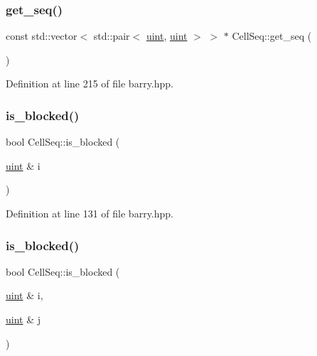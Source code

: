 \subsubsection{\texorpdfstring{get\+\_\+seq()}{get\_seq()}}
{\footnotesize\ttfamily const std\+::vector$<$ std\+::pair$<$ \hyperlink{namespacebarry_a11dfc53ddb4672278319aa04f1e09a6c}{uint}, \hyperlink{namespacebarry_a11dfc53ddb4672278319aa04f1e09a6c}{uint} $>$ $>$ $\ast$ Cell\+Seq\+::get\+\_\+seq (\begin{DoxyParamCaption}{ }\end{DoxyParamCaption})\hspace{0.3cm}{\ttfamily [inline]}}



Definition at line 215 of file barry.\+hpp.

\mbox{\label{classbarry_1_1_cell_seq_a994900efdcf73e7619f728d584e92c5a}} 
\subsubsection{\texorpdfstring{is\+\_\+blocked()}{is\_blocked()}\hspace{0.1cm}{\footnotesize\ttfamily [1/2]}}
{\footnotesize\ttfamily bool Cell\+Seq\+::is\+\_\+blocked (\begin{DoxyParamCaption}\item[{\hyperlink{namespacebarry_a11dfc53ddb4672278319aa04f1e09a6c}{uint} \&}]{i }\end{DoxyParamCaption})\hspace{0.3cm}{\ttfamily [inline]}}



Definition at line 131 of file barry.\+hpp.

\mbox{\label{classbarry_1_1_cell_seq_a5a5730ec094c9a4251753302a9504149}} 
\subsubsection{\texorpdfstring{is\+\_\+blocked()}{is\_blocked()}\hspace{0.1cm}{\footnotesize\ttfamily [2/2]}}
{\footnotesize\ttfamily bool Cell\+Seq\+::is\+\_\+blocked (\begin{DoxyParamCaption}\item[{\hyperlink{namespacebarry_a11dfc53ddb4672278319aa04f1e09a6c}{uint} \&}]{i,  }\item[{\hyperlink{namespacebarry_a11dfc53ddb4672278319aa04f1e09a6c}{uint} \&}]{j }\end{DoxyParamCaption})\hspace{0.3cm}{\ttfamily [inline]}}



